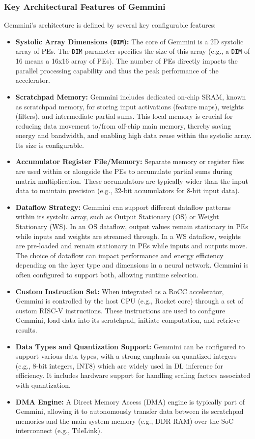 \subsubsection{Key Architectural Features of Gemmini}
Gemmini's architecture is defined by several key configurable features:
\begin{itemize}
    \item \textbf{Systolic Array Dimensions (\texttt{DIM}):} The core of Gemmini is a 2D systolic array of PEs. The \texttt{DIM} parameter specifies the size of this array (e.g., a \texttt{DIM} of 16 means a 16x16 array of PEs). The number of PEs directly impacts the parallel processing capability and thus the peak performance of the accelerator.
    \item \textbf{Scratchpad Memory:} Gemmini includes dedicated on-chip SRAM, known as scratchpad memory, for storing input activations (feature maps), weights (filters), and intermediate partial sums. This local memory is crucial for reducing data movement to/from off-chip main memory, thereby saving energy and bandwidth, and enabling high data reuse within the systolic array. Its size is configurable.
    \item \textbf{Accumulator Register File/Memory:} Separate memory or register files are used within or alongside the PEs to accumulate partial sums during matrix multiplication. These accumulators are typically wider than the input data to maintain precision (e.g., 32-bit accumulators for 8-bit input data).
    \item \textbf{Dataflow Strategy:} Gemmini can support different dataflow patterns within its systolic array, such as Output Stationary (OS) or Weight Stationary (WS). In an OS dataflow, output values remain stationary in PEs while inputs and weights are streamed through. In a WS dataflow, weights are pre-loaded and remain stationary in PEs while inputs and outputs move. The choice of dataflow can impact performance and energy efficiency depending on the layer type and dimensions in a neural network. Gemmini is often configured to support both, allowing runtime selection.
    \item \textbf{Custom Instruction Set:} When integrated as a RoCC accelerator, Gemmini is controlled by the host CPU (e.g., Rocket core) through a set of custom RISC-V instructions. These instructions are used to configure Gemmini, load data into its scratchpad, initiate computation, and retrieve results.
    \item \textbf{Data Types and Quantization Support:} Gemmini can be configured to support various data types, with a strong emphasis on quantized integers (e.g., 8-bit integers, INT8) which are widely used in DL inference for efficiency. It includes hardware support for handling scaling factors associated with quantization.
    \item \textbf{DMA Engine:} A Direct Memory Access (DMA) engine is typically part of Gemmini, allowing it to autonomously transfer data between its scratchpad memories and the main system memory (e.g., DDR RAM) over the SoC interconnect (e.g., TileLink).
\end{itemize}

